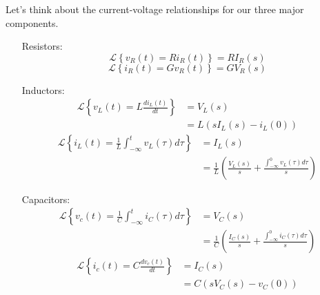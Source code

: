 \documentclass[nobib]{tufte-handout}
\begin{document}
Let's think about the current-voltage 
relationships for our three major 
components. 
\begin{itemize}
    \item[Resistors:] 
    \begin{equation}
        \mathcal{L}\left\{v_R(t) = Ri_R(t)\right\} = RI_R(s)
    \end{equation}
    \begin{equation}
        \mathcal{L}\left\{i_R(t) = Gv_R(t)\right\} = GV_R(s)
    \end{equation}
    \item[Inductors:] 
    \begin{align}
        \mathcal{L}\left\{v_L(t) = L\frac{di_L(t)}{dt}\right\} &= V_L(s) \\
        &= L\left(sI_L(s) - i_L(0)\right)
    \end{align}
    \begin{align}
        \mathcal{L}\left\{i_L(t) = \frac{1}{L} \int_{-\infty}^{t}v_L(\tau) d\tau\right\} &= I_L(s) \\
        &= \frac{1}{L} \left(\frac{V_L(s)}{s} + \frac{\int_{-\infty}^{0} v_L(\tau) d\tau}{s}\right)
    \end{align}
    \item[Capacitors:]
    \begin{align}
        \mathcal{L}\left\{v_c(t) = \frac{1}{C} \int_{-\infty}^{t}i_C(\tau) d\tau\right\} &= V_C(s) \\
        &= \frac{1}{C} \left( \frac{I_C(s)}{s} + \frac{\int_{-\infty}^{0} i_C(\tau) d\tau}{s}\right)
    \end{align}
    \begin{align}
        \mathcal{L}\left\{i_c(t) = C \frac{dv_c(t)}{dt}\right\} &= I_C(s) \\
        &= C\left(sV_C(s) - v_C(0)\right)
    \end{align}
\end{itemize}
\end{document}
